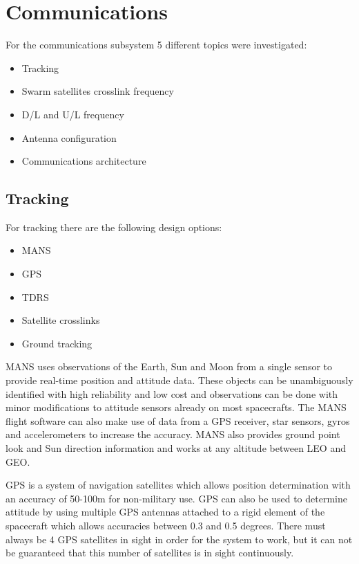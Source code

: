 \section{Communications}
\label{blDOCOM}

For the communications subsystem 5 different topics were investigated:
\begin{itemize}
\item Tracking
\item Swarm satellites crosslink frequency
\item D/L and U/L frequency
\item Antenna configuration
\item Communications architecture
\end{itemize}

\subsection{Tracking}
For tracking there are the following design options:
\begin {itemize}
\item \ac{MANS}
\item \acs{GPS}
\item \ac{TDRS}
\item Satellite crosslinks
\item Ground tracking
\end {itemize}

MANS uses observations of the Earth, Sun and Moon from a single sensor to provide real-time position and attitude data. These objects can be unambiguously identified with high reliability and low cost and observations can be done with minor modifications to attitude sensors already on most spacecrafts. The MANS flight software can also make use of data from a GPS receiver, star sensors, gyros and accelerometers to increase the accuracy. MANS also provides ground point look and Sun direction information and works at any altitude between \acs{LEO} and \acs{GEO}.

GPS is a system of navigation satellites which allows position determination with an accuracy of 50-100m for non-military use. GPS can also be used to determine attitude by using multiple GPS antennas attached to a rigid element of the spacecraft which allows accuracies between 0.3 and 0.5 degrees. There must always be 4 GPS satellites in sight in order for the system to work, but it can not be guaranteed that this number of satellites is in sight continuously.


